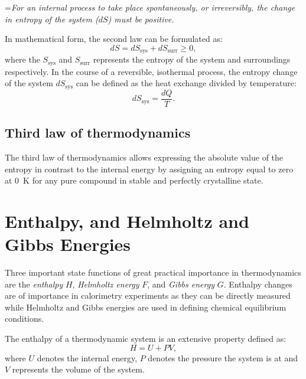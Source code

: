 	\hangindent=\parindent \emph{For an internal process to take place spontaneously, or irreversibly, the change in entropy of the system ($dS$) must be positive.}

	\noindent In mathematical form, the second law can be formulated as:
	\begin{equation}\label{eqn:slot}
		dS = dS_\text{sys} + dS_\text{surr} \geq 0,
	\end{equation}
	where the $S_\text{sys}$ and $S_\text{surr}$ represents the entropy of the system and surroundings respectively.
	In the course of a reversible, isothermal process, the entropy change of the system $dS_\text{sys}$   can be defined as the heat exchange divided by temperature:
	\begin{equation}\label{eqn:slotrev}
		dS_\text{sys} = \frac{dQ}{T}.
	\end{equation}

	\subsection{Third law of thermodynamics}
	The third law of thermodynamics allows expressing the absolute value of the entropy in contrast to the internal energy by assigning an entropy equal to zero at \SI{0}{\kelvin} for any pure compound in stable and perfectly crystalline state.

\section{Enthalpy, and Helmholtz and Gibbs Energies}
		Three important state functions of great practical importance in thermodynamics are the \emph{enthalpy} $H$, \emph{Helmholtz energy} $F$, and \emph{Gibbs energy} $G$. Enthalpy changes are of importance in calorimetry experiments as they can be directly measured while Helmholtz and Gibbs energies are used in defining chemical equilibrium conditions.

		The enthalpy of a thermodynamic system is an extensive property defined as:
		\begin{equation}
			H = U + PV,
		\end{equation}
		where $U$ denotes the internal energy, $P$ denotes the pressure the system is at and $V$ represents the volume of the system.

